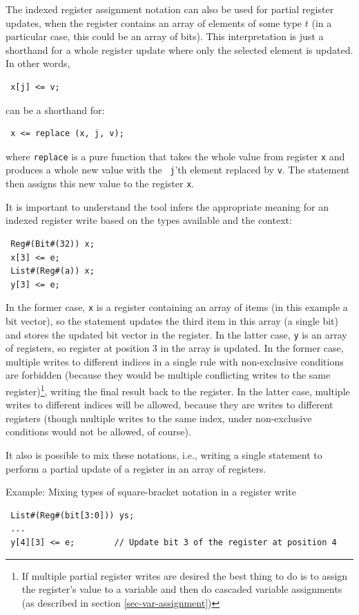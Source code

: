 \documentclass[twoside,letterpaper]{article}
\newcommand{\term}[1]{\texttt{#1}}
\begin{document}
The indexed register assignment notation can also be used for partial register
updates, when the register contains an array of elements of some type
$t$ (in a particular case, this could be an array of bits). This interpretation
is just a shorthand for a whole register update where only the selected element
is updated.  In other words,
\begin{verbatim}
 x[j] <= v;
\end{verbatim}
can be a shorthand for:
\begin{verbatim}
 x <= replace (x, j, v);
\end{verbatim}
where \term{replace} is a pure function that takes the whole value
from register {\term{x}} and produces a whole new value with the {\tt
j}'th element replaced by \texttt{v}.  The statement then assigns this
new value to the register \texttt{x}.

It is important to understand the tool infers the appropriate meaning 
for an indexed register write based on the types available and the 
context:
\begin{verbatim}
 Reg#(Bit#(32)) x;
 x[3] <= e;
 List#(Reg#(a)) x;
 y[3] <= e;
\end{verbatim}
In the former case, \texttt{x} is a register containing an array of
items (in this example a bit vector), so the statement updates the 
third item in this array (a single bit) and stores the updated bit 
vector in the register.  In the latter case, \texttt{y} is an array 
of registers, so register at position 3 in the array is updated. 
In the former case, multiple writes to different indices in a single 
rule with non-exclusive conditions are forbidden (because they would 
be multiple conflicting writes to the same register)\footnote{If 
multiple partial register writes are desired the best thing to do is 
to assign the register's value to a variable and then do cascaded 
variable assignments (as described in section \ref{sec-var-assignment})},
writing the final result back to the register. In the latter case, multiple 
writes to different indices will be allowed, because they are writes to 
different registers (though multiple writes to the same index, under 
non-exclusive conditions would not be allowed, of course). 

It also is possible to mix these notations, i.e., writing a single 
statement to perform a partial update of a register in an array of 
registers. 

Example: Mixing types of square-bracket notation in a register write
\begin{verbatim}
 List#(Reg#(bit[3:0])) ys;
 ...
 y[4][3] <= e;        // Update bit 3 of the register at position 4
\end{verbatim}
\end{document}
